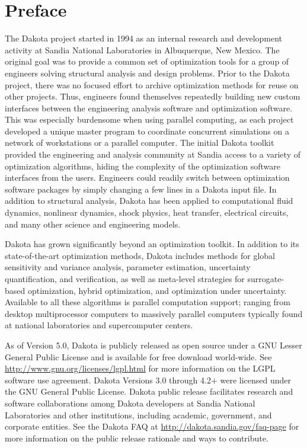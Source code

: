 \chapter*{Preface}

The Dakota project started in 1994 as an internal research and
development activity at Sandia National Laboratories in Albuquerque,
New Mexico. The original goal was to provide a common set of
optimization tools for a group of engineers solving structural
analysis and design problems. Prior to the Dakota project, there was
no focused effort to archive optimization methods for reuse on other
projects. Thus, engineers found themselves repeatedly building new
custom interfaces between the engineering analysis software and
optimization software. This was especially burdensome when using
parallel computing, as each project developed a unique master program
to coordinate concurrent simulations on a network of workstations or a
parallel computer. The initial Dakota toolkit provided the engineering
and analysis community at Sandia access to a variety of optimization
algorithms, hiding the complexity of the optimization software
interfaces from the users. Engineers could readily switch between
optimization software packages by simply changing a few lines in a
Dakota input file. In addition to structural analysis, Dakota has been
applied to computational fluid dynamics, nonlinear dynamics, shock
physics, heat transfer, electrical circuits, and many other science
and engineering models.

Dakota has grown significantly beyond an optimization toolkit.  In
addition to its state-of-the-art optimization methods, Dakota includes
methods for global sensitivity and variance analysis, parameter
estimation, uncertainty quantification, and verification, as well as
meta-level strategies for surrogate-based optimization, hybrid
optimization, and optimization under uncertainty. Available to all
these algorithms is parallel computation support; ranging from desktop
multiprocessor computers to massively parallel computers typically
found at national laboratories and supercomputer centers.

As of Version 5.0, Dakota is publicly released as open source under a
GNU Lesser General Public License and is available for free download
world-wide.  See \url{http://www.gnu.org/licenses/lgpl.html} for more
information on the LGPL software use agreement.  Dakota Versions 3.0
through 4.2+ were licensed under the GNU General Public License.
Dakota public release facilitates research and software collaborations
among Dakota developers at Sandia National Laboratories and other
institutions, including academic, government, and corporate
entities. See the Dakota FAQ at
\url{http://dakota.sandia.gov/faq-page} for more information on the
public release rationale and ways to contribute.

